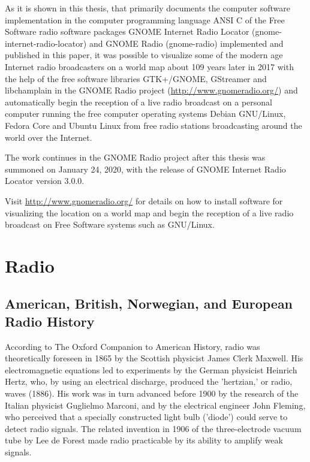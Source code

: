 \documentclass[a4paper,norsk,utf8]{report}
\begin{document}
    As it is shown in this thesis, that primarily documents the
    computer software implementation in the computer programming language 
    ANSI C of the Free Software radio software packages GNOME Internet Radio Locator
    (gnome-internet-radio-locator) and GNOME Radio (gnome-radio)
    implemented and published in this paper, it was possible to
    visualize some of the modern age Internet radio broadcasters on a
    world map about 109 years later in 2017 with the help of the free
    software libraries GTK+/GNOME, GStreamer and libchamplain in the
    GNOME Radio project (\url{http://www.gnomeradio.org/}) and
    automatically begin the reception of a live radio broadcast on a
    personal computer running the free computer operating systems Debian
    GNU/Linux, Fedora Core and Ubuntu Linux from free radio stations
    broadcasting around the world over the Internet.
    
    The work continues in the GNOME Radio project after this thesis
    was summoned on January 24, 2020, with the release of GNOME
    Internet Radio Locator version 3.0.0.

    Visit
    \url{http://www.gnomeradio.org/} for details on how to install
    software for visualizing the location on a world map and begin
    the reception of a live radio broadcast on Free Software systems
    such as GNU/Linux.

\part{Radio}

\chapter{American, British, Norwegian, and European Radio History}

    According to The Oxford Companion to American History, radio was
    theoretically foreseen in 1865 by the Scottish physicist James
    Clerk Maxwell.  His electromagnetic equations led to experiments
    by the German physicist Heinrich Hertz, who, by using an
    electrical discharge, produced the 'hertzian,' or radio, waves
    (1886).  His work was in turn advanced before 1900 by the research
    of the Italian physicist Guglielmo Marconi, and by the electrical
    engineer John Fleming, who perceived that a specially constructed
    light bulb ('diode') could serve to detect radio signals.  The
    related invention in 1906 of the three-electrode vacuum tube by
    Lee de Forest made radio practicable by its ability to amplify
    weak signals.
\end{document}
